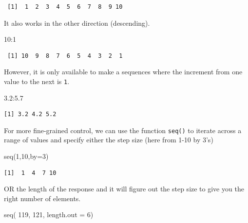 \documentclass[
  letterpaper,
]{book}
\newenvironment{Shaded}{\begin{snugshade}}{\end{snugshade}}
\newcommand{\AttributeTok}[1]{\textcolor[rgb]{0.40,0.45,0.13}{#1}}
\newcommand{\DecValTok}[1]{\textcolor[rgb]{0.68,0.00,0.00}{#1}}
\newcommand{\FloatTok}[1]{\textcolor[rgb]{0.68,0.00,0.00}{#1}}
\newcommand{\FunctionTok}[1]{\textcolor[rgb]{0.28,0.35,0.67}{#1}}
\newcommand{\NormalTok}[1]{\textcolor[rgb]{0.00,0.23,0.31}{#1}}
\newcommand{\SpecialCharTok}[1]{\textcolor[rgb]{0.37,0.37,0.37}{#1}}
\begin{document}
\begin{verbatim}
 [1]  1  2  3  4  5  6  7  8  9 10
\end{verbatim}

It also works in the other direction (descending).

\begin{Shaded}
\begin{Highlighting}[]
\DecValTok{10}\SpecialCharTok{:}\DecValTok{1}
\end{Highlighting}
\end{Shaded}

\begin{verbatim}
 [1] 10  9  8  7  6  5  4  3  2  1
\end{verbatim}

However, it is only available to make a sequences where the increment
from one value to the next is \texttt{1}.

\begin{Shaded}
\begin{Highlighting}[]
\FloatTok{3.2}\SpecialCharTok{:}\FloatTok{5.7}
\end{Highlighting}
\end{Shaded}

\begin{verbatim}
[1] 3.2 4.2 5.2
\end{verbatim}

For more fine-grained control, we can use the function \texttt{seq()} to
iterate across a range of values and specify either the step size (here
from 1-10 by 3's)

\begin{Shaded}
\begin{Highlighting}[]
\FunctionTok{seq}\NormalTok{(}\DecValTok{1}\NormalTok{,}\DecValTok{10}\NormalTok{,}\AttributeTok{by=}\DecValTok{3}\NormalTok{)}
\end{Highlighting}
\end{Shaded}

\begin{verbatim}
[1]  1  4  7 10
\end{verbatim}

OR the length of the response and it will figure out the step size to
give you the right number of elements.

\begin{Shaded}
\begin{Highlighting}[]
\FunctionTok{seq}\NormalTok{( }\DecValTok{119}\NormalTok{, }\DecValTok{121}\NormalTok{, }\AttributeTok{length.out =} \DecValTok{6}\NormalTok{)}
\end{Highlighting}
\end{Shaded}
\end{document}
